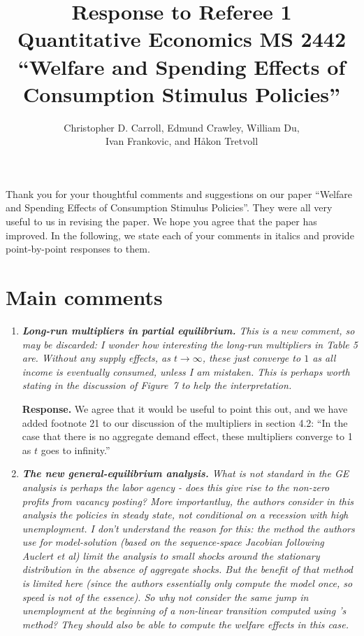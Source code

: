 \documentclass[12pt,letterpaper,english]{article}
\title{\textbf{Response to Referee 1\\ Quantitative Economics MS 2442 \\``Welfare and Spending Effects of \\ Consumption Stimulus Policies''}}
\author{Christopher D. Carroll, Edmund Crawley, William Du, \\ Ivan Frankovic, and H\aa kon Tretvoll}
\date{}
\begin{document}
	\onehalfspacing
	\maketitle
	
\noindent Thank you for your thoughtful comments and suggestions on our paper ``Welfare and Spending Effects of Consumption Stimulus Policies''. They were all very useful to us in revising the paper. We hope you agree that the paper has improved. In the following, we state each of your comments in italics and provide point-by-point responses to them.


\section*{Main comments}
\begin{enumerate}[label=(\alph*)]
	\item \textit{\textbf{Long-run multipliers in partial equilibrium.} This is a new comment, so
		may be discarded: I wonder how interesting the long-run multipliers	in Table 5 are. Without any supply effects, as $t \rightarrow \infty$, these just converge to $1$ as all income is eventually consumed, unless I am mistaken. This is perhaps worth stating in the discussion of Figure~7 to help the interpretation.}
	
	\noindent \textbf{Response.} We agree that it would be useful to point this out, and we have added footnote 21 to our discussion of the multipliers in section 4.2: ``In the case that there is no aggregate demand effect, these multipliers converge to 1 as $t$ goes to infinity.''
	
	\item \textit{\textbf{The new general-equilibrium analysis.} What is not standard in the GE analysis is perhaps the labor agency - does this give rise to the non-zero profits from vacancy posting? More importantluy, the authors consider in this analysis the policies in steady state, not conditional	on a recession with high unemployment. I don't understand the reason for this: the method the authors use for model-solution (based on the sequence-space Jacobian following Auclert et al) limit the analysis to small shocks around the stationary distribution in the absence of aggregate shocks. But the benefit of that method is	limited here (since the authors essentially only compute the model once, so speed is not of the essence). So why not consider the same jump in unemployment at the beginning of a non-linear transition computed using \citet{boppart2018exploiting}'s method? They should also be able to compute the welfare effects in this case.}
	

\end{enumerate}
\end{document}
